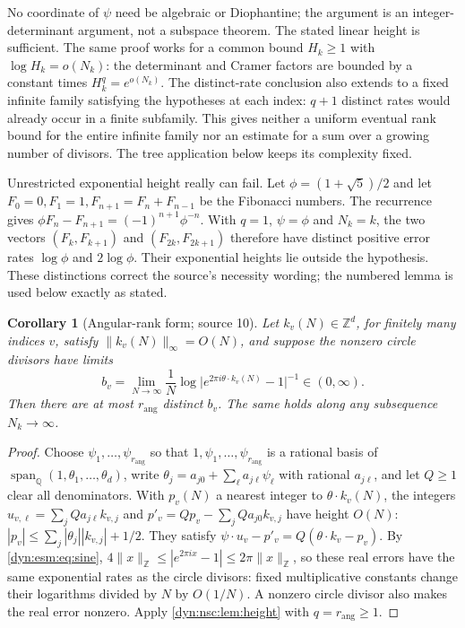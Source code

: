 \documentclass[11pt,letterpaper]{article}
\newtheorem{corollary}[corollary]{Corollary}
\theoremstyle{definition}
\theoremstyle{remark}
\newcommand{\Q}{\mathbb Q}
\newcommand{\Z}{\mathbb Z}
\newcommand{\rang}{r_{\mathrm{ang}}}
\numberwithin{equation}{section}
\begin{document}
No coordinate of $\psi$ need be algebraic or Diophantine; the argument is an
integer-determinant argument, not a subspace theorem. The stated linear
height is sufficient. The same proof works for a common bound $H_k\ge1$
with $\log H_k=o(N_k)$: the determinant and Cramer factors are bounded
by a constant times $H_k^q=e^{o(N_k)}$. The distinct-rate conclusion also
extends to a fixed infinite family satisfying the hypotheses at each index:
$q+1$ distinct rates would already occur in a finite subfamily. This gives
neither a uniform eventual rank bound for the entire infinite family nor an
estimate for a sum over a growing number of divisors. The tree application
below keeps its complexity fixed.

Unrestricted exponential height really can fail. Let
$\phi=(1+\sqrt5)/2$ and let $F_0=0,F_1=1,F_{n+1}=F_n+F_{n-1}$ be
the Fibonacci numbers. The recurrence gives
$\phi F_n-F_{n+1}=(-1)^{n+1}\phi^{-n}$. With $q=1$, $\psi=\phi$
and $N_k=k$, the two vectors
$(F_k,F_{k+1})$ and $(F_{2k},F_{2k+1})$ therefore have distinct positive
error rates $\log\phi$ and $2\log\phi$. Their exponential heights lie
outside the hypothesis. These distinctions correct the source's necessity
wording; the numbered lemma is used below exactly as stated.

\begin{corollary}[Angular-rank form; source 10]\label{dyn:nsc:cor:angular}
Let $k_v(N)\in\Z^{d}$, for finitely many indices $v$, satisfy
$\|k_v(N)\|_\infty=O(N)$, and suppose the nonzero circle divisors have
limits
\[
 b_v=\lim_{N\to\infty}\frac1N\log\bigl|e^{2\pi i\theta\cdot k_v(N)}-1\bigr|^{-1}
 \in(0,\infty).
\]
Then there are at most $\rang$ distinct $b_v$. The same holds along any
subsequence $N_k\to\infty$.
\end{corollary}
\begin{proof}
Choose $\psi_1,\dots,\psi_{\rang}$ so that $1,\psi_1,\dots,\psi_{\rang}$ is a
rational basis of $\operatorname{span}_{\Q}(1,\theta_1,\dots,\theta_d)$, write
$\theta_j=a_{j0}+\sum_{\ell}a_{j\ell}\psi_\ell$ with rational $a_{j\ell}$,
and let $Q\ge1$ clear all denominators. With $p_v(N)$ a nearest integer to
$\theta\cdot k_v(N)$, the integers
$u_{v,\ell}=\sum_jQa_{j\ell}k_{v,j}$ and
$p'_v=Qp_v-\sum_jQa_{j0}k_{v,j}$ have height $O(N)$:
$|p_v|\le\sum_j|\theta_j||k_{v,j}|+1/2$. They satisfy
$\psi\cdot u_v-p'_v=Q(\theta\cdot k_v-p_v)$. By \eqref{dyn:esm:eq:sine},
$4\|x\|_{\Z}\le|e^{2\pi ix}-1|\le2\pi\|x\|_{\Z}$, so these real errors have
the same exponential rates as the circle divisors: fixed multiplicative
constants change their logarithms divided by $N$ by $O(1/N)$.
A nonzero circle divisor also makes the real error nonzero.
Apply \cref{dyn:nsc:lem:height} with $q=\rang\ge1$.
\end{proof}
\end{document}
